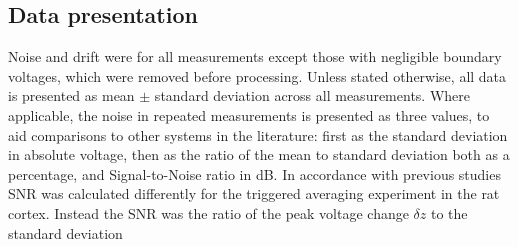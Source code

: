 \subsection{Data presentation}

Noise and drift were for all measurements except those with negligible boundary voltages, which were removed before processing. Unless stated otherwise, all data is presented as mean $\pm$ standard deviation across all measurements. Where applicable, the noise in repeated measurements is presented as three values, to aid comparisons to other systems in the literature: first as the standard deviation in absolute voltage, then as the ratio of the mean to standard deviation both as a percentage, and Signal-to-Noise ratio in dB. In accordance with previous studies SNR was calculated differently for the triggered averaging experiment in the rat cortex. Instead the SNR was the ratio of the peak voltage change $\delta z$ to the standard deviation  \cite{Oh2011} 
